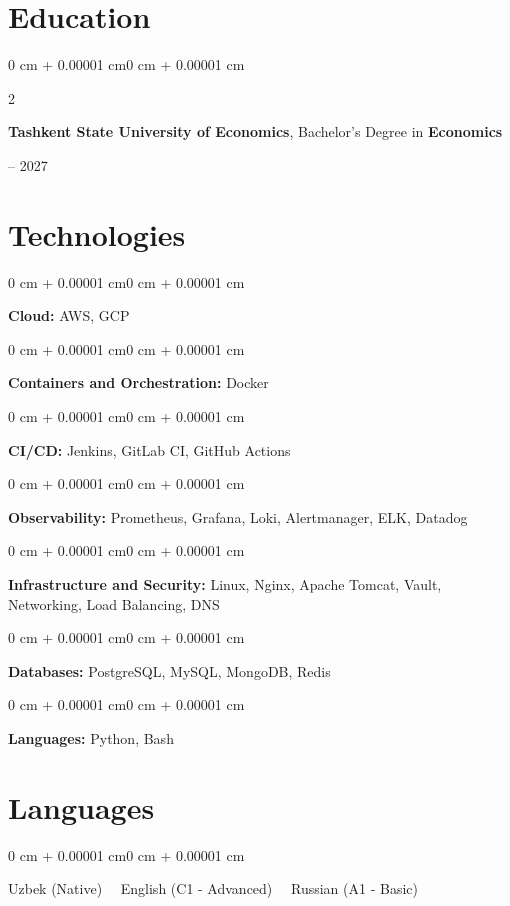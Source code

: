 \documentclass[10pt, letterpaper]{article}
\newenvironment{onecolentry}{
    \begin{adjustwidth}{0 cm + 0.00001 cm}{0 cm + 0.00001 cm}
}{
    \end{adjustwidth}
}
\newenvironment{twocolentry}[2][]{
    \onecolentry
    \def\secondColumn{#2}
    \setcolumnwidth{\fill, 4.5 cm}
    \begin{paracol}{2}
}{
    \switchcolumn \raggedleft \secondColumn
    \end{paracol}
    \endonecolentry
}
\begin{document}
    \section{Education}
    \begin{twocolentry}{2022 -- 2027}
        \textbf{Tashkent State University of Economics}, Bachelor's Degree in \textbf{Economics}
    \end{twocolentry}
    
\section{Technologies}

\begin{onecolentry}
\textbf{Cloud:} AWS, GCP
\end{onecolentry}

\vspace{0.2 cm}

\begin{onecolentry}
\textbf{Containers and Orchestration:} Docker
\end{onecolentry}

\vspace{0.2 cm}

\begin{onecolentry}
\textbf{CI/CD:} Jenkins, GitLab CI, GitHub Actions
\end{onecolentry}

\vspace{0.2 cm}

\begin{onecolentry}
\textbf{Observability:} Prometheus, Grafana, Loki, Alertmanager, ELK, Datadog
\end{onecolentry}

\vspace{0.2 cm}

\begin{onecolentry}
\textbf{Infrastructure and Security:} Linux, Nginx, Apache Tomcat, Vault, Networking, Load Balancing, DNS
\end{onecolentry}

\vspace{0.2 cm}

\begin{onecolentry}
\textbf{Databases:} PostgreSQL, MySQL, MongoDB, Redis
\end{onecolentry}

\vspace{0.2 cm}

\begin{onecolentry}
\textbf{Languages:} Python, Bash
\end{onecolentry}

    \section{Languages}
    \begin{onecolentry}
        Uzbek (Native) \ \AND\ English (C1 - Advanced) \ \AND\ Russian (A1 - Basic)
    \end{onecolentry}
\end{document}
